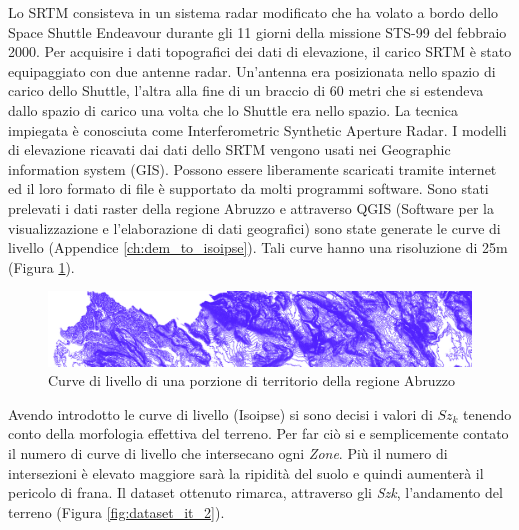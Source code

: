 Lo SRTM consisteva in un sistema radar modificato che ha volato a bordo dello Space Shuttle Endeavour durante gli 11 giorni della missione STS-99 del febbraio 2000. Per acquisire i dati topografici dei dati di elevazione, il carico SRTM è stato equipaggiato con due antenne radar. Un'antenna era posizionata nello spazio di carico dello Shuttle, l'altra alla fine di un braccio di 60 metri che si estendeva dallo spazio di carico una volta che lo Shuttle era nello spazio. La tecnica impiegata è conosciuta come Interferometric Synthetic Aperture Radar. I modelli di elevazione ricavati dai dati dello SRTM vengono usati nei Geographic information system (GIS). Possono essere liberamente scaricati tramite internet ed il loro formato di file è supportato da molti programmi software. Sono stati prelevati i dati raster della regione Abruzzo e attraverso QGIS (Software per la visualizzazione e l'elaborazione di dati geografici) sono state generate le curve di livello (Appendice \ref{ch:dem_to_isoipse}). Tali curve hanno una risoluzione di 25m (Figura \ref{fig:curve_di_livello}).

\begin{figure}[h]
	\centering
	\includegraphics[width=1\textwidth]{images/dettaglioCurve.PNG}
	\caption{Curve di livello di una porzione di territorio della regione Abruzzo}
	\label{fig:curve_di_livello}
\end{figure}

Avendo introdotto le curve di livello (Isoipse) si sono decisi i valori di $Sz_k$ tenendo conto della morfologia effettiva del terreno. 
Per far ciò si e semplicemente contato il numero di curve di livello che intersecano ogni \textit{Zone}. Più il numero di intersezioni è elevato maggiore sarà la ripidità del suolo e quindi aumenterà il pericolo di frana. Il dataset ottenuto rimarca, attraverso gli \textit{Szk}, l'andamento del terreno (Figura \ref{fig:dataset_it_2}).

